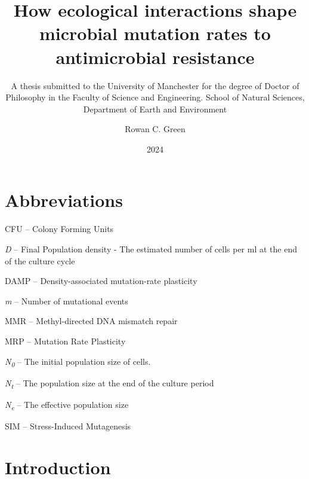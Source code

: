 \documentclass[
  12pt,
  letterpaper,
  DIV=11,
  numbers=noendperiod]{scrreprt}
\title{How ecological interactions shape microbial mutation rates to
antimicrobial resistance}
\subtitle{A thesis submitted to the University of Manchester for the
degree of Doctor of Philosophy in the Faculty of Science and
Engineering. School of Natural Sciences, Department of Earth and
Environment}
\author{Rowan C. Green}
\date{2024}
\renewcommand*\contentsname{Table of contents}
\newcommand\contentsname{Table of contents}
\begin{document}
\maketitle
\ifdefined\Shaded\renewenvironment{Shaded}{\begin{tcolorbox}[boxrule=0pt, sharp corners, enhanced, interior hidden, frame hidden, breakable, borderline west={3pt}{0pt}{shadecolor}]}{\end{tcolorbox}}\fi

\renewcommand*\contentsname{Table of contents}
{
\hypersetup{linkcolor=}
\setcounter{tocdepth}{2}
\tableofcontents
}
\listoffigures
\listoftables
{}

\hypertarget{abbreviations}{%
\chapter*{Abbreviations}\label{abbreviations}}


CFU -- Colony Forming Units

\emph{D} -- Final Population density - The estimated number of cells per
ml at the end of the culture cycle

DAMP -- Density-associated mutation-rate plasticity

\emph{m} -- Number of mutational events

MMR -- Methyl-directed DNA mismatch repair

MRP -- Mutation Rate Plasticity

\emph{N\textsubscript{0}} -- The initial population size of cells.

\emph{N\textsubscript{t}} -- The population size at the end of the
culture period

\emph{N\textsubscript{e}} -- The effective population size

SIM -- Stress-Induced Mutagenesis


\hypertarget{introduction}{%
\chapter{Introduction}\label{introduction}}
\end{document}
